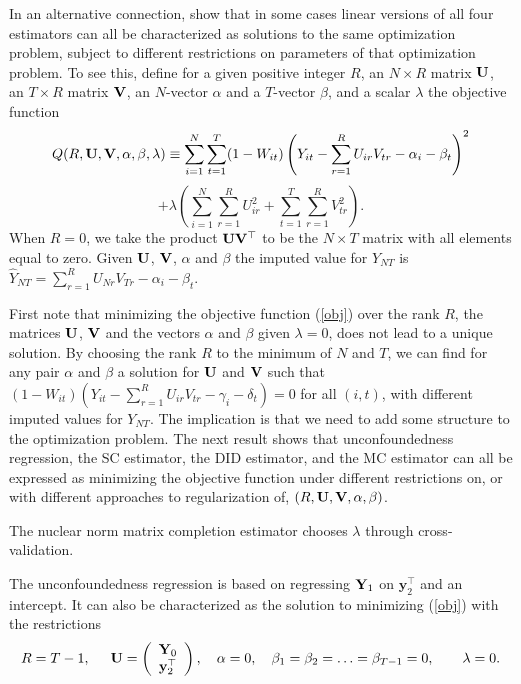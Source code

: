 \documentclass[letterpaper,12pt,leqno]{article}
\newcommand{\bv}{{\bf V}}
\newcommand{\bu}{{\bf U}}
\newcommand{\tty}{{\mathbf{Y}_0}}
\newcommand{\bytt}{\mathbf{y}_2^\top}
\newcommand{\by}{{\bf Y}}
\begin{document}
In an alternative connection,
\citep*{athey2021matrix} show that in some cases linear versions of all four estimators can all be characterized as solutions to the same optimization problem, subject to different restrictions on parameters of that optimization problem.
To see this, 
define for a given positive integer $R$, an $N\times R$ matrix $\bu$, an $T\times R$ matrix $\bv$, an $N$-vector $\alpha$ and a $T$-vector $\beta$, and a scalar $\lambda$ the objective  function
\begin{equation}\label{obj}
Q(R,\bu,\bv,\alpha,\beta,\lambda)\equiv
\sum_{i=1}^N\sum_{t=1}^T
(1-W_{it})\left( Y_{it}-
\sum_{r=1}^R U_{ir}V_{tr}-\alpha_i-\beta_t
\right)^2
		\end{equation}
  \[+\lambda\left(\sum_{i=1}^N\sum_{r=1}^R U_{ir}^2+\sum_{t=1}^T\sum_{r=1}^R V_{tr}^2\right).\]
When $R=0$, we take the product $\bu\bv^\top$ to be the $N\times T$ matrix with all elements equal to zero.
Given $\bu$, $\bv$, $\alpha$ and $\beta$ the imputed value for $Y_{NT}$ is
$\hat{Y}_{NT}=\sum_{r=1}^R U_{Nr}V_{Tr}-\alpha_i-\beta_t$.


First note that  minimizing  the objective function (\ref{obj}) over  the rank $R$, the matrices $\bu$, $\bv$ and the  vectors $\alpha$ and $\beta$ given $\lambda=0$, does not lead to a unique solution. By choosing the rank $R$ to the minimum of $N$ and $T$, we can find for any pair $\alpha$ and $\beta$ a solution for $\bu$ and $\bv$ such that
$(1-W_{it})( Y_{it}-
\sum_{r=1}^R U_{ir}V_{tr}-\gamma_i-\delta_t
)=0$ for all $(i,t)$, with different imputed values for $Y_{NT}$.
The implication is that we need to add some structure to the optimization problem. The next result shows that unconfoundedness regression,  the  SC estimator, the DID estimator, and the MC estimator can all be expressed as minimizing  the objective function under different restrictions on,  or with different approaches to regularization of, $(R,\bu,\bv,\alpha,\beta)$.

The nuclear norm matrix completion estimator chooses $\lambda$ through cross-validation.

The unconfoundedness regression is based on regressing $\by_1$ on $\bytt$ and an intercept. It can also be characterized as the solution to minimizing (\ref{obj})
with
the restrictions
\[
		R=T-1,\hskip0.5cm
		\bu=
		\left(
		\begin{array}{c}
		\tty \\
		\bytt
		\end{array}\right),\quad \alpha=0, \quad \beta_1=\beta_2=\ldots=\beta_{T-1}=0,\qquad \lambda=0.
		\]
\end{document}
